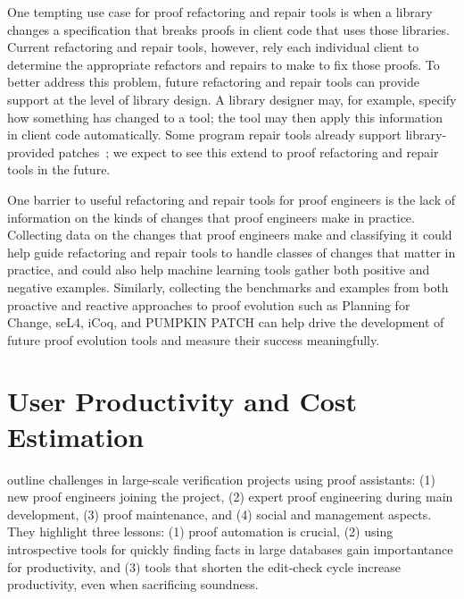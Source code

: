 One tempting use case for proof refactoring and repair tools is when a library changes a specification
that breaks proofs in client code that uses those libraries. Current refactoring and repair tools,
however, rely each individual client to determine the appropriate refactors and repairs to make
to fix those proofs. To better address this problem, future refactoring and repair tools
can provide support at the level of library design.
A library designer may, for example, specify how something has changed to a tool;
the tool may then apply this information in client code automatically. 
Some program repair tools already support library-provided patches~\citep{Monperrus2018};
we expect to see this extend to proof refactoring and repair tools in the future.

One barrier to useful refactoring and repair tools for proof engineers is the lack of information
on the kinds of changes that proof engineers make in practice. Collecting data on the changes
that proof engineers make and classifying it could help guide refactoring and repair tools
to handle classes of changes that matter in practice, and could also help machine learning tools
gather both positive and negative examples. Similarly, collecting the benchmarks and examples from
both proactive and reactive approaches to proof evolution such as Planning for Change, seL4, iCoq, and \textsc{PUMPKIN PATCH} 
can help drive the development of future proof evolution tools and measure their success meaningfully.

\section{User Productivity and Cost Estimation}
\label{sec:productivity}

\cite{Bourke12} outline challenges in large-scale verification projects using proof assistants: (1) new proof engineers joining the project, (2) expert proof engineering during main development, (3) proof maintenance, and (4) social and management aspects. They highlight three lessons: (1) proof automation is crucial, (2) using introspective tools for quickly finding facts in large databases gain importantance for productivity, and (3) tools that shorten the edit-check cycle increase productivity, even when sacrificing soundness.


